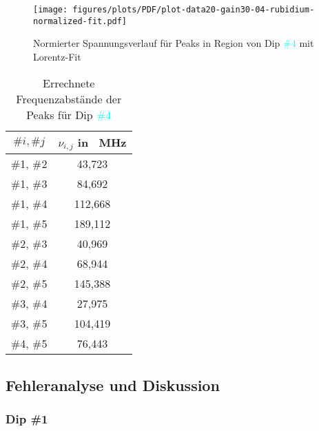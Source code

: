 \begin{minipage}{12cm}
\begin{figure}[H]
    \centering
    \texttt{[image: figures/plots/PDF/plot-data20-gain30-04-rubidium-normalized-fit.pdf]}
    \caption{Normierter Spannungsverlauf für Peaks in Region von Dip \textcolor{cyan}{\#4} mit Lorentz-Fit}
    \label{fig:plot-data20-gain30-04-rubidium-normalized-fit}
\end{figure}
\end{minipage}
\hskip0.5cm
\begin{minipage}{4cm}
\begin{table}[H]
    \centering
    \begin{tabular}{|c|c|}
        \hline
         $\#i, \#j$         &       $\nu_{i,j}$ in \SI{}{\mega \hertz}      \\
        \hline
        \hline
         \#1, \#2           &       43,723      \\
        \hline
         \#1, \#3           &       84,692      \\
        \hline
         \#1, \#4           &      112,668      \\
        \hline
         \#1, \#5           &      189,112      \\
        \hline
         \#2, \#3           &       40,969      \\
        \hline
         \#2, \#4           &       68,944      \\
        \hline
         \#2, \#5           &      145,388      \\
        \hline
         \#3, \#4           &       27,975      \\
        \hline
         \#3, \#5           &      104,419      \\
        \hline
         \#4, \#5           &       76,443      \\
        \hline 
    \end{tabular}
    \caption{Errechnete Frequenzabstände der Peaks für Dip \textcolor{cyan}{\#4}}
    \label{tab:plot-data20-gain30-04}
\end{table}
\end{minipage}

\subsection{Fehleranalyse und Diskussion}

\subsubsection{Dip \textcolor{red!80!black}{\#1}}

